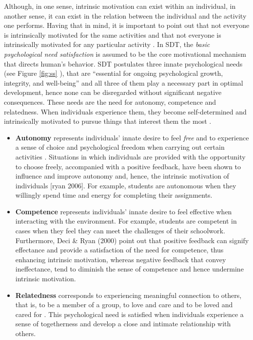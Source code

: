 Although, in one sense, intrinsic motivation can exist within an individual, in another sense, it can exist in the relation between the individual and the activity one performs. Having that in mind, it is important to point out that not everyone is intrinsically motivated for the same activities and that not everyone is intrinsically motivated for any particular activity \cite{ryan2000intrinsic}. In SDT, the \textit{basic psychological need satisfaction} is assumed to be the core motivational mechanism that directs human's behavior. SDT postulates three innate psychological needs (see Figure \ref{fig:ss} ), that are ``essential for ongoing psychological growth, integrity, and well-being'' and all three of them play a necessary part in optimal development, hence none can be disregarded without significant negative consequences. These needs are the need for autonomy, competence and relatedness. When individuals experience them, they become self-determined and intrinsically motivated to pursue things that interest them the most \cite{deci2000and}. %
\begin{itemize}
\item \textbf{Autonomy} represents individuals' innate desire to feel \textit{free} and to experience a sense of choice and psychological freedom when carrying out certain activities \cite{deci2000and}. Situations in which individuals are provided with the opportunity to choose freely, accompanied with a positive feedback, have been shown to influence and improve autonomy and, hence, the intrinsic motivation of individuals [ryan 2006]. For example, students  are  autonomous when they willingly spend time and energy for completing their assignments. 
\item \textbf{Competence} represents individuals' innate desire to feel effective when interacting with the environment. For example, students are competent in cases when they feel they can meet the challenges of their schoolwork. Furthermore, Deci \& Ryan (2000) point out that positive feedback can signify effectance and provide a satisfaction of the need for competence, thus enhancing intrinsic motivation, whereas negative feedback that convey ineffectance, tend  to
diminish the sense of competence and hence undermine intrinsic motivation. 


\item \textbf{Relatedness} corresponds to experiencing meaningful connection to others, that is, to be a member of a group, to love and care and to be loved and cared for \cite{broeck2010capturing}. This psychological need is satisfied when individuals experience a sense of togetherness and develop a close and intimate relationship with others.
\end{itemize}
